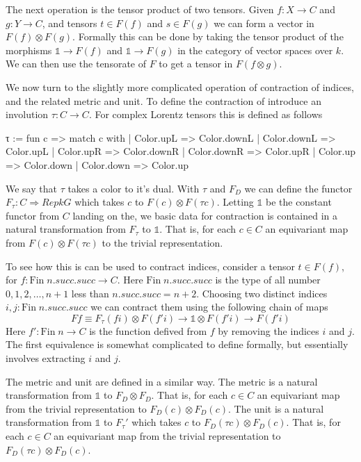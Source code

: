 \documentclass[a4paper, 11pt]{article}
\begin{document}
The next operation is the tensor product of two tensors. Given $f : X \to C$ and
$g : Y \to C$, and tensors $t \in F(f)$ and $s \in F(g)$ we can form a vector in 
$F(f) \otimes F(g)$. Formally this can be done by taking the tensor product of the morphisms
$\mathbb{1} \to F(f)$ and $\mathbb{1} \to F(g)$ in the category of vector spaces over $k$.
We can then use the tensorate of $F$ to get a tensor in $F(f \otimes g)$.

We now turn to the slightly more complicated operation of contraction of indices, 
and the related metric and unit. 
To define the contraction of introduce an involution $\tau : C \to C$. For complex Lorentz tensors
this is defined as follows
\begin{code} 
  τ := fun c =>
    match c with
    | Color.upL => Color.downL
    | Color.downL => Color.upL
    | Color.upR => Color.downR
    | Color.downR => Color.upR
    | Color.up => Color.down
    | Color.down => Color.up
\end{code}
We say that $\tau$ takes a color to it's dual. With $\tau$ and $F_D$ we can define 
the functor  $F_\tau : C \Rightarrow Rep k G$ which takes $c$ to $F(c) \otimes F(\tau c)$. 
Letting $\mathbb{1}$ be the constant functor from $C$ landing on the, we basic data 
for contraction is contained in a natural transformation from $F_\tau$ to $\mathbb{1}$.
That is, for each $c \in C$ an equivariant map from $F(c) \otimes F(\tau c)$ to the trivial 
representation. 

To see how this is can be used to contract indices, consider a tensor $t \in F(f)$, 
for $f : \mathrm{Fin} \; n.succ.succ \to C$. Here $\mathrm{Fin} \; n.succ.succ$ is the type 
of all number ${0, 1, 2, \ldots, n+1}$ less than $n.succ.succ = n + 2$. 
Choosing two distinct indices $i, j : \mathrm{Fin} \; n.succ.succ$ we can contract them 
using the following chain of maps
\begin{equation}
  F f \equiv F_\tau (f i) \otimes F (f' i) \to \mathbb{1} \otimes F (f' i) \to F (f' i)
\end{equation}
Here $f' : \mathrm{Fin} \; n \to C$ is the function defived from $f$ by removing the indices $i$ 
and $j$. The first equivalence is somewhat complicated to define formally, but essentially involves 
extracting $i$ and $j$. 

The metric and unit are defined in a similar way. The metric is a natural transformation from
$\mathbb{1}$ to $F_D\otimes F_D$. That is, for each $c \in C$ an equivariant map from the trivial
representation to $F_D(c) \otimes F_D(c)$. The unit is a natural transformation from $\mathbb{1}$ to
$F_\tau'$ which takes $c$ to $F_D(\tau c) \otimes F_D(c)$. That is, for each $c \in C$ an 
equivariant map from the trivial representation to  $F_D(\tau c) \otimes F_D(c)$.
\end{document}
